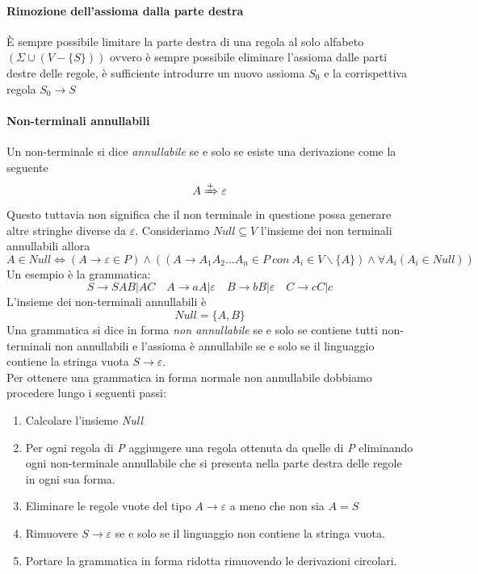 \paragraph{Rimozione dell'assioma dalla parte destra}
È sempre possibile limitare la parte destra di una regola al solo alfabeto $ (\Sigma \cup (V-\{S\})) $ ovvero è sempre possibile eliminare l'assioma dalle parti destre delle regole, è sufficiente introdurre un nuovo assioma $ S_0 $ e la corrispettiva regola $ S_0\rightarrow S $
\paragraph{Non-terminali annullabili}
Un non-terminale si dice \emph{annullabile} se e solo se esiste una derivazione come la seguente
$$A\xRightarrow{+}\varepsilon$$
Questo tuttavia non significa che il non terminale in questione possa generare altre stringhe diverse da $ \varepsilon $.
Consideriamo $ Null\subseteq V $ l'insieme dei non terminali annullabili allora
$$A \in Null \iff (A\rightarrow \varepsilon \in P)\wedge ((A\rightarrow A_1A_2\dots A_n \in P \ con \ A_i\in V\backslash\{A\})\wedge \forall A_i (A_i \in Null))$$
Un esempio è la grammatica:
$$S\rightarrow SAB | AC \quad A\rightarrow aA|\varepsilon \quad B\rightarrow bB|\varepsilon \quad C\rightarrow cC|c$$
L'insieme dei non-terminali annullabili è 
$$Null= \{ A,B\}$$
Una grammatica si dice in forma \emph{non annullabile} se e solo se contiene tutti non-terminali non annullabili e l'assioma è annullabile se e solo se il linguaggio contiene la stringa vuota $S\rightarrow \varepsilon$.\\
Per ottenere una grammatica in forma normale non annullabile dobbiamo procedere lungo i seguenti passi:
\begin{enumerate}
	\item Calcolare l'insieme \emph{Null}
	\item Per ogni regola di \emph{P} aggiungere una regola ottenuta da quelle di \emph{P} eliminando ogni non-terminale annullabile che si presenta nella parte destra delle regole in ogni sua forma.
	\item Eliminare le regole vuote del tipo $ A\rightarrow \varepsilon $ a meno che non sia $ A=S $
	\item Rimuovere $ S\rightarrow \varepsilon $ se e solo se il linguaggio non contiene la stringa vuota.
	\item Portare la grammatica in forma ridotta rimuovendo le derivazioni circolari.
\end{enumerate}
